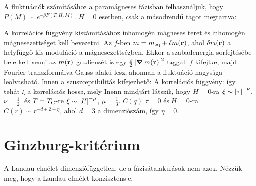   A fluktuációk számításához a paramágneses fázisban felhasználjuk, hogy $P(M)\sim e^{-\beta F(T,H,M)}$. $H=0$ esetben, csak a másodrendű tagot megtartva:
  
  A korrelációs függvény kiszámításához inhomogén mágneses teret és inhomogén mágnesezettséget kell bevezetni. Az $f$-ben $m=m_\text{eq}+\delta m(\mathbf{r})$, ahol $\delta m(\mathbf{r})$ a helyfüggő kis moduláció a mágnesezettségben. Ekkor a szabadenergia sorfejtésébe bele kell venni az $m(\mathbf{r})$ gradiensét is egy $\frac{c}{2}\left\lvert\mathop{\boldsymbol{\nabla}}\nolimits{m(\mathbf{r})}\right\rvert^2$ taggal. $f$ kifejtve, majd Fourier-transzformálva Gauss-alakú lesz, ahonnan a fluktuáció nagysága leolvasható. Innen a szuszceptibilitás kifejezhető:
  A korrelációs függvény:
  így tehát $\xi$ a korrelációs hossz, mely
  Inenn mindjárt látszik, hogy $H=0$-ra $\xi\sim \left\lvert\tau\right\rvert^{-\nu}$, $\nu=\frac{1}{2}$. és $T=T_\text{C}$-re $\xi\sim \left\lvert H\right\rvert^{-\mu}$, $\mu=\frac{1}{3}$. $C(q)$ $\tau=0$ és $H=0$-ra $C(r)\sim r^{-d+2-\eta}$, ahol $d=3$ a dimenziószám, így $\eta=0$.
  
 \section{Ginzburg-kritérium}
  
  A Landau-elmélet dimenziófüggetlen, de a fázisátalakulások nem azok. Nézzük meg, hogy a Landau-elmélet konzisztens-e. 
  
